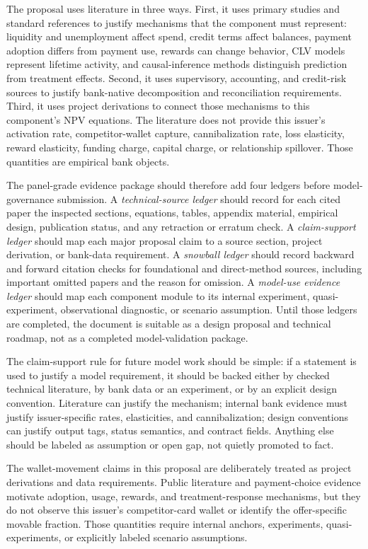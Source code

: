 \documentclass[11pt]{article}
\newcommand{\1}{\mathbf{1}}
\begin{document}
The proposal uses literature in three ways. First, it uses primary studies and
standard references to justify mechanisms that the component must represent:
liquidity and unemployment affect spend, credit terms affect balances, payment
adoption differs from payment use, rewards can change behavior, CLV models
represent lifetime activity, and causal-inference methods distinguish
prediction from treatment effects. Second, it uses supervisory, accounting,
and credit-risk sources to justify bank-native decomposition and reconciliation
requirements. Third, it uses project derivations to connect those mechanisms
to this component's NPV equations. The literature does not provide this
issuer's activation rate, competitor-wallet capture, cannibalization rate,
loss elasticity, reward elasticity, funding charge, capital charge, or
relationship spillover. Those quantities are empirical bank objects.

The panel-grade evidence package should therefore add four ledgers before
model-governance submission. A \emph{technical-source ledger} should record
for each cited paper the inspected sections, equations, tables, appendix
material, empirical design, publication status, and any retraction or erratum
check. A \emph{claim-support ledger} should map each major proposal claim to a
source section, project derivation, or bank-data requirement. A
\emph{snowball ledger} should record backward and forward citation checks for
foundational and direct-method sources, including important omitted papers and
the reason for omission. A \emph{model-use evidence ledger} should map each
component module to its internal experiment, quasi-experiment, observational
diagnostic, or scenario assumption. Until those ledgers are completed, the
document is suitable as a design proposal and technical roadmap, not as a
completed model-validation package.

The claim-support rule for future model work should be simple: if a statement
is used to justify a model requirement, it should be backed either by checked
technical literature, by bank data or an experiment, or by an explicit design
convention. Literature can justify the mechanism; internal bank evidence must
justify issuer-specific rates, elasticities, and cannibalization; design
conventions can justify output tags, status semantics, and contract fields.
Anything else should be labeled as assumption or open gap, not quietly promoted
to fact.

The wallet-movement claims in this proposal are deliberately treated as project
derivations and data requirements. Public literature and payment-choice
evidence motivate adoption, usage, rewards, and treatment-response mechanisms,
but they do not observe this issuer's competitor-card wallet or identify the
offer-specific movable fraction. Those quantities require internal anchors,
experiments, quasi-experiments, or explicitly labeled scenario assumptions.
\end{document}
